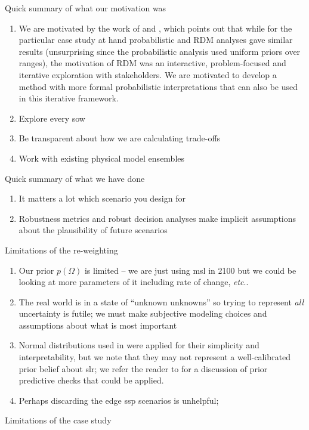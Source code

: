 \documentclass[12pt]{article}
\makeatletter
\DeclareRobustCommand\onedot{\futurelet\@let@token\@onedot}
\def\@onedot{\ifx\@let@token.\else.\null\fi\xspace}
\def\etc{\emph{etc}\onedot} \def\vs{\emph{vs}\onedot}
\DeclareRobustCommand\onedot{\futurelet\@let@token\@onedot}
\def\@onedot{\ifx\@let@token.\else.\null\fi\xspace}
\def\etc{\emph{etc}\onedot} \def\vs{\emph{vs}\onedot}
\makeatother
\begin{document}
Quick summary of what our motivation was
\begin{enumerate}
    \item We are motivated by the work of \citet{sriver_sealevel:2018} and \citet{lempert_slr:2012}, which points out that while for the particular case study at hand probabilistic and RDM analyses gave similar results (unsurprising since the probabilistic analysis used uniform priors over ranges), the motivation of RDM was an interactive,  problem-focused and iterative exploration with stakeholders. We are motivated to develop a method with more formal probabilistic interpretations that can also be used in this iterative framework.
    \item Explore every \gls{sow}
    \item Be transparent about how we are calculating trade-offs
    \item Work with existing physical model ensembles
\end{enumerate}
Quick summary of what we have done
\begin{enumerate}
    \item It matters a lot which scenario you design for
    \item Robustness metrics and robust decision analyses make implicit assumptions about the plausibility of future scenarios
\end{enumerate}
Limitations of the re-weighting
\begin{enumerate}
    \item Our prior $p(\Omega)$ is limited -- we are just using \gls{msl} in 2100 but we could be looking at more parameters of it including rate of change, \etc
    \item The real world is in a state of ``unknown unknowns'' \citep[level 5 as defined in][fig.~1]{walker_deep:2013} so trying to represent \emph{all} uncertainty is futile; we must make subjective modeling choices and assumptions about what is most important
    \item Normal distributions used in \citet{fuller_inversion:2017} were applied for their simplicity and interpretability, but we note that they may not represent a well-calibrated prior belief about \gls{slr}; we refer the reader to \citet{gelman_workflow:2020} for a discussion of prior predictive checks that could be applied.
    \item Perhaps discarding the edge \gls{ssp} scenarios is unhelpful;
\end{enumerate}
Limitations of the case study
\end{document}
